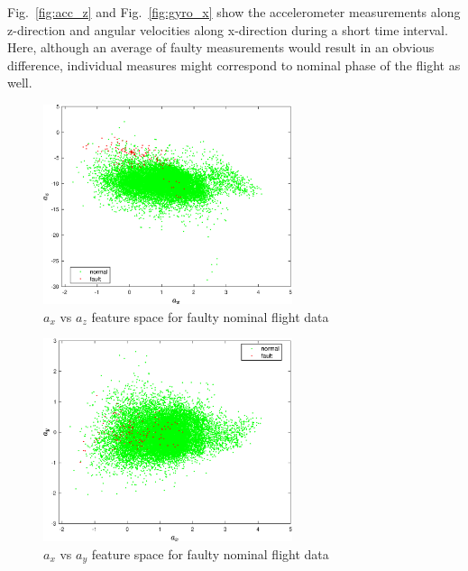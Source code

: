 Fig.~\ref{fig:acc_z} and Fig.~\ref{fig:gyro_x} show the accelerometer measurements along z-direction and angular velocities along x-direction during a short time interval. 
Here, although an average of faulty measurements would result in an obvious difference, individual measures might correspond to nominal phase of the flight as well.

\begin{figure}[!h]
\begin{center}
\includegraphics[width=0.65\textwidth]{figures/feat1vsfeat3FaultStuck}    %
\caption{$a_x$ vs $a_z$ feature space for faulty nominal flight data} 
\label{fig:feat1vsfeat3FaultStuck}
\end{center}
\end{figure}

\begin{figure}[h]
\begin{center}
\includegraphics[width=0.65\textwidth]{figures/feat1vsfeat2FaultStuck}    %
\caption{$a_x$ vs $a_y$ feature space for faulty nominal flight data} 
\label{fig:feat1vsfeat2FaultStuck}
\end{center}
\end{figure}

